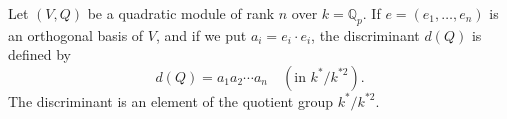 Let $(V, Q)$ be a quadratic module of rank $n$ over $k = \mathbb{Q}_p$. If $e = (e_1, \ldots, e_n)$ is an orthogonal basis of $V$, and if we put $a_i = e_i \cdot e_i$, the discriminant $d(Q)$ is defined by
$$d(Q) = a_1 a_2 \cdots a_n \quad (\text{in } k^*/k^{*2}).$$
The discriminant is an element of the quotient group $k^*/k^{*2}$.
